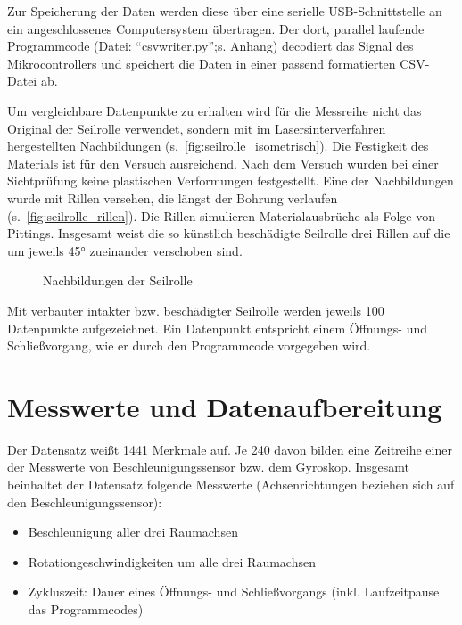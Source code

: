 Zur Speicherung der Daten werden diese über eine serielle USB-Schnittstelle an ein angeschlossenes Computersystem übertragen. Der dort, parallel laufende Programmcode (Datei: \enquote{csvwriter.py};s. Anhang) decodiert das Signal des Mikrocontrollers und speichert die Daten in einer passend formatierten CSV-Datei ab.

Um vergleichbare Datenpunkte zu erhalten wird für die Messreihe nicht das Original der Seilrolle verwendet, sondern mit im Lasersinterverfahren hergestellten Nachbildungen (s.~\cref{fig:seilrolle_isometrisch}). Die Festigkeit des Materials ist für den Versuch ausreichend. Nach dem Versuch wurden bei einer Sichtprüfung keine plastischen Verformungen festgestellt. Eine der Nachbildungen wurde mit Rillen versehen, die längst der Bohrung verlaufen (s.~\cref{fig:seilrolle_rillen}). Die Rillen simulieren Materialausbrüche als Folge von Pittings. Insgesamt weist die so künstlich beschädigte Seilrolle drei Rillen auf die um jeweils 45° zueinander verschoben sind.

\begin{figure}[ht]
	\centering
	\qquad
	\caption{Nachbildungen der Seilrolle}
	\label{fig:cad_seilrolle}
\end{figure}

Mit verbauter intakter bzw. beschädigter Seilrolle werden jeweils 100 Datenpunkte aufgezeichnet. Ein Datenpunkt entspricht einem Öffnungs- und Schließvorgang, wie er durch den Programmcode vorgegeben wird.
\section{Messwerte und Datenaufbereitung}
\label{sec:messdaten}
Der Datensatz weißt \num{1441} Merkmale auf. Je \num{240} davon bilden eine Zeitreihe einer der Messwerte von Beschleunigungssensor bzw. dem Gyroskop. Insgesamt beinhaltet der Datensatz folgende Messwerte (Achsenrichtungen beziehen sich auf den Beschleunigungssensor):
\begin{itemize}
	\item Beschleunigung aller drei Raumachsen
	\item Rotationgeschwindigkeiten um alle drei Raumachsen
	\item Zykluszeit: Dauer eines Öffnungs- und Schließvorgangs (inkl. Laufzeitpause das Programmcodes)
\end{itemize}

